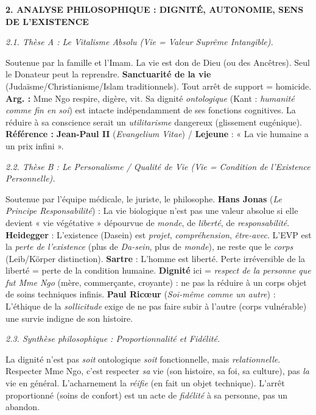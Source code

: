 \documentclass[11pt]{article}
\newcommand{\cle}[1]{{\popxbold\color{popdark}#1}}
\begin{document}
\begin{exoresolu}
\noindent\textbf{2. ANALYSE PHILOSOPHIQUE : DIGNITÉ, AUTONOMIE, SENS DE L'EXISTENCE}\par
\emph{2.1. Thèse A : Le Vitalisme Absolu (Vie = Valeur Suprême Intangible).}\par
Soutenue par la famille et l'Imam. La vie est don de Dieu (ou des Ancêtres). Seul le Donateur peut la reprendre. \textbf{Sanctuarité de la vie} (Judaïsme/Christianisme/Islam traditionnels). Tout arrêt de support = homicide. \textbf{Arg. :} Mme Ngo respire, digère, vit. Sa dignité \emph{ontologique} (Kant : \emph{humanité comme fin en soi}) est intacte indépendamment de ses fonctions cognitives. La réduire à sa conscience serait un \emph{utilitarisme} dangereux (glissement eugénique). \textbf{Référence :} \textbf{Jean-Paul II} (\emph{Evangelium Vitae}) / \textbf{Lejeune} : « La vie humaine a un prix infini ».\par
\emph{2.2. Thèse B : Le Personalisme / Qualité de Vie (Vie = Condition de l'Existence Personnelle).}\par
Soutenue par l'équipe médicale, le juriste, le philosophe. \textbf{Hans Jonas} (\emph{Le Principe Responsabilité}) : La vie biologique n'est pas une valeur absolue si elle devient « vie végétative » dépourvue de \emph{monde}, de \emph{liberté}, de \emph{responsabilité}. \textbf{Heidegger} : L'\cle{existence} (Dasein) est \emph{projet}, \emph{compréhension}, \emph{être-avec}. L'EVP est la \emph{perte de l'existence} (plus de \emph{Da-sein}, plus de \emph{monde}), ne reste que le \emph{corps} (Leib/Körper distinction). \textbf{Sartre} : L'homme est liberté. Perte irréversible de la liberté = perte de la condition humaine. \textbf{Dignité} ici = \emph{respect de la personne que fut Mme Ngo} (mère, commerçante, croyante) : ne pas la réduire à un corps objet de soins techniques infinis. \textbf{Paul Ricœur} (\emph{Soi-même comme un autre}) : L'éthique de la \emph{sollicitude} exige de ne pas faire subir à l'autre (corps vulnérable) une survie indigne de son histoire.\par
\emph{2.3. Synthèse philosophique : Proportionnalité et Fidélité.}\par
La dignité n'est pas \emph{soit} ontologique \emph{soit} fonctionnelle, mais \emph{relationnelle}. Respecter Mme Ngo, c'est respecter \emph{sa} vie (son histoire, sa foi, sa culture), pas \emph{la} vie en général. L'acharnement la \emph{réifie} (en fait un objet technique). L'arrêt proportionné (soins de confort) est un acte de \emph{fidélité} à sa personne, pas un abandon.\par
\vspace{0.3cm}


\end{exoresolu}
\end{document}
